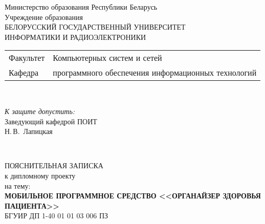 \begin{titlepage}
  \begin{center}
    Министерство образования Республики Беларусь\\[1em]
    Учреждение образования\\
    БЕЛОРУССКИЙ ГОСУДАРСТВЕННЫЙ УНИВЕРСИТЕТ \\
    ИНФОРМАТИКИ И РАДИОЭЛЕКТРОНИКИ\\[1em]

    \begin{minipage}{\textwidth}
      \begin{flushleft}
        \begin{tabular}{ l l }
          Факультет & Компьютерных систем и сетей\\
          Кафедра   & программного обеспечения информационных технологий
        \end{tabular}
      \end{flushleft}
    \end{minipage}\\[1em]

    \begin{flushright}
      \begin{minipage}{0.4\textwidth}
        \textit{К защите допустить:}\\[0.8em]
        Заведующий кафедрой ПОИТ\\[0.45em]
        \underline{\hspace*{2.8cm}} Н.\,В.~Лапицкая
      \end{minipage}\\[2.2em]
    \end{flushright}

    {ПОЯСНИТЕЛЬНАЯ ЗАПИСКА}\\
    {к дипломному проекту}\\
    {на тему:}\\[1em]
    \textbf{\large МОБИЛЬНОЕ ПРОГРАММНОЕ СРЕДСТВО <<ОРГАНАЙЗЕР ЗДОРОВЬЯ ПАЦИЕНТА>>}\\[1em]


    {БГУИР ДП 1-40 01 01 03 006 ПЗ}\\[2em]
    

\end{center}
\end{titlepage}
